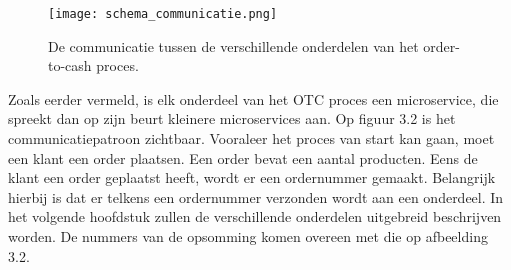 \begin{figure}[h!]
	\texttt{[image: schema\_communicatie.png]}
	\caption{De communicatie tussen de verschillende onderdelen van het order-to-cash proces.}
	\centering
\end{figure}
Zoals eerder vermeld, is elk onderdeel van het OTC proces een microservice, die spreekt dan op zijn beurt kleinere microservices aan.
Op figuur 3.2 is het communicatiepatroon zichtbaar.
Vooraleer het proces van start kan gaan, moet een klant een order plaatsen. Een order bevat een aantal producten. Eens de klant een order geplaatst heeft, wordt er een ordernummer gemaakt. Belangrijk hierbij is dat er telkens een ordernummer verzonden wordt aan een onderdeel.
In het volgende hoofdstuk zullen de verschillende onderdelen uitgebreid beschrijven worden.
De nummers van de opsomming komen overeen met die op afbeelding 3.2.
